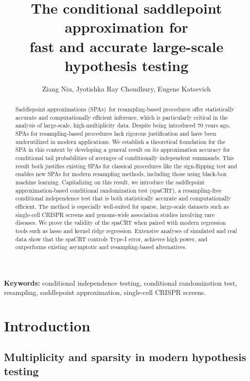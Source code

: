 \documentclass[12pt]{article}
\title{The conditional saddlepoint approximation for\\ fast and accurate large-scale hypothesis testing}
\theoremstyle{definition}
\begin{document}
\author{Ziang Niu, Jyotishka Ray Choudhury, Eugene Katsevich}
\maketitle




\begin{abstract}
  Saddlepoint approximations (SPAs) for resampling-based procedures offer statistically accurate and computationally efficient inference, which is particularly critical in the analysis of  large-scale, high-multiplicity data. Despite being introduced  70 years ago, SPAs for resampling-based procedures lack rigorous justification and have been underutilized in modern applications. We establish a theoretical foundation for the SPA in this context by developing a general result on its approximation accuracy for conditional tail probabilities of averages of conditionally independent summands. This result both justifies existing SPAs for classical procedures like the sign-flipping test and enables new SPAs for modern resampling methods, including those using black-box machine learning. Capitalizing on this result, we introduce the saddlepoint approximation-based conditional randomization test (spaCRT), a resampling-free conditional independence test that is both statistically accurate and computationally efficient. The method is especially well-suited for sparse, large-scale datasets such as single-cell CRISPR screens and genome-wide association studies involving rare diseases. We prove the validity of the spaCRT when paired with modern regression tools such as lasso and kernel ridge regression. Extensive analyses of simulated and real data show that the spaCRT controls Type-I error, achieves high power, and outperforms existing asymptotic and resampling-based alternatives.
\end{abstract}
\textbf{Keywords:} conditional independence testing, conditional randomization test, resampling, saddlepoint approximation, single-cell CRISPR screens.
  
\section{Introduction} \label{sec:introduction}
  
\subsection{Multiplicity and sparsity in modern hypothesis testing} \label{sec:statistical-computational-challenges}
\end{document}
